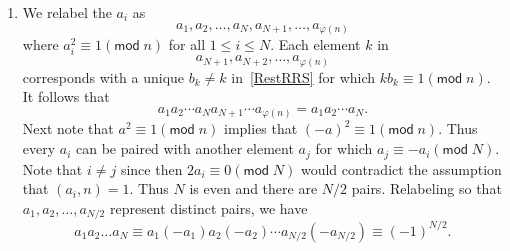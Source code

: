 \documentclass[12pt]{article}
\renewcommand{\pmod}[1]{\left(\mathsf{mod}\;#1\right)}
\begin{document}
\begin{enumerate}
\item %
We relabel the $a_i$ as
\[a_1,a_2,\ldots,a_N,a_{N+1},\ldots,a_{\varphi\left(n\right)}\]
where $a_i^2\equiv 1\pmod{n}$ for all $1\le i\le N$.
Each element $k$ in
\begin{equation}\label{RestRRS}
a_{N+1},a_{N+2},\ldots,a_{\varphi\left(n\right)}
\end{equation}
corresponds with a unique $b_k\ne k$ in~\autoref{RestRRS}
for which $kb_k\equiv 1\pmod{n}$. It follows that
\[a_1a_2\cdots a_Na_{N+1}\cdots a_{\varphi\left(n\right)}
=a_1a_2\cdots a_N.\]
Next note that $a^2\equiv 1\pmod{n}$ implies that
$\left(-a\right)^2\equiv 1\pmod{n}$.
Thus every $a_i$ can be paired with another element
$a_j$ for which $a_j\equiv -a_i\pmod{N}$.
Note that $i\ne j$ since then $2a_i\equiv 0\pmod{N}$
would contradict the assumption that $\left(a_i,n\right)=1$.
Thus $N$ is even and there are $N/2$ pairs.
Relabeling so that $a_1,a_2,\ldots,a_{N/2}$ represent
distinct pairs, we have
\begin{equation*}
a_1a_2\ldots a_N
\equiv a_1\left(-a_1\right)a_2\left(-a_2\right)
\cdots a_{N/2}\left(-a_{N/2}\right)\equiv \left(-1\right)^{N/2}.
\end{equation*}
\end{enumerate}
\end{document}
